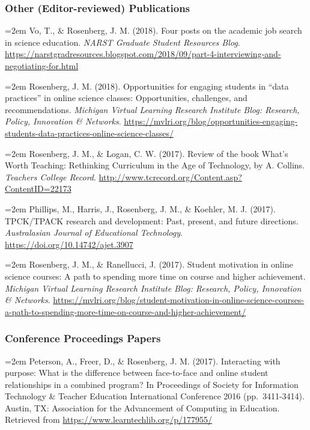 \documentclass[]{article}
\begin{document}
\subsubsection{Other (Editor-reviewed)
Publications}\label{other-editor-reviewed-publications}

\hangindent=2em Vo, T., \& Rosenberg, J. M. (2018). Four posts on the
academic job search in science education. \emph{NARST Graduate Student
Resources Blog}.
\url{https://narstgradresources.blogspot.com/2018/09/part-4-interviewing-and-negotiating-for.html}

\hangindent=2em Rosenberg, J. M. (2018). Opportunities for engaging
students in ``data practices'' in online science classes: Opportunities,
challenges, and recommendations. \emph{Michigan Virtual Learning
Research Institute Blog: Research, Policy, Innovation \& Networks}.
\url{https://mvlri.org/blog/opportunities-engaging-students-data-practices-online-science-classes/}

\hangindent=2em Rosenberg, J. M., \& Logan, C. W. (2017). Review of the
book What's Worth Teaching: Rethinking Curriculum in the Age of
Technology, by A. Collins. \emph{Teachers College Record}.
\url{http://www.tcrecord.org/Content.asp?ContentID=22173}

\hangindent=2em Phillips, M., Harris, J., Rosenberg, J. M., \& Koehler,
M. J. (2017). TPCK/TPACK research and development: Past, present, and
future directions. \emph{Australasian Journal of Educational
Technology}. \url{https://doi.org/10.14742/ajet.3907}

\hangindent=2em Rosenberg, J. M., \& Ranellucci, J. (2017). Student
motivation in online science courses: A path to spending more time on
course and higher achievement. \emph{Michigan Virtual Learning Research
Institute Blog: Research, Policy, Innovation \& Networks}.
\url{https://mvlri.org/blog/student-motivation-in-online-science-courses-a-path-to-spending-more-time-on-course-and-higher-achievement/}

\subsubsection{Conference Proceedings
Papers}\label{conference-proceedings-papers}

\hangindent=2em Peterson, A., Freer, D., \& Rosenberg, J. M. (2017).
Interacting with purpose: What is the difference between face-to-face
and online student relationships in a combined program? In Proceedings
of Society for Information Technology \& Teacher Education International
Conference 2016 (pp.~3411-3414). Austin, TX: Association for the
Advancement of Computing in Education. Retrieved from
\url{https://www.learntechlib.org/p/177955/}
\end{document}
